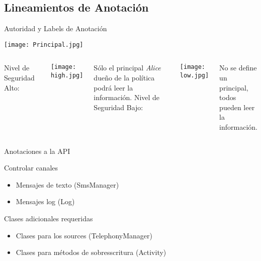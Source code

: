 \subsection{Lineamientos de Anotación} 
\begin{frame}{Autoridad y Labels de Anotación}
	\begin{center}
	\texttt{[image: Principal.jpg]}
	\end{center}
	\begin{columns}[T]
	\column{2in}
	Nivel de Seguridad Alto:
	\begin{center}
	\vspace{-0.5em}
	\texttt{[image: high.jpg]}\newline
	\vspace{-1.5em}
	\end{center}
	Sólo el principal \emph{Alice}\\ dueño de la política \\ podrá leer la
	información.
	\column{2in}
	Nivel de Seguridad Bajo:
	\begin{center}
	\vspace{-0.5em} 
	\texttt{[image: low.jpg]}\newline
	\vspace{-1.5em}
	\end{center}
	No se define un principal,\\
	todos pueden leer\\
	la información.
	\end{columns}
\end{frame}	
\begin{frame}{Anotaciones a la API} %
	\begin{block}{Controlar canales} 
	\begin{itemize}
	  \item Mensajes de texto (SmsManager)
	  \item Mensajes log (Log)
	\end{itemize} 
	\end{block}
	\pause
	\begin{block}{Clases adicionales requeridas}
		\begin{itemize}
		  \item Clases para los sources (TelephonyManager)
		  \item Clases para métodos de sobresscritura (Activity)
		\end{itemize}
	\end{block}
\end{frame}	
